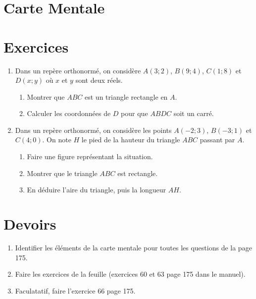 \documentclass{article}
\begin{document}
\section{Carte Mentale}
\section{Exercices}
\begin{enumerate}[label=\textbf{Exercice \arabic* : }]
\item Dans un repère orthonormé, on considère $A(3;2)$, $B(9;4)$, $C(1;8)$ et $D(x;y)$ où $x$ et $y$ sont deux réels.
\begin{enumerate}
    \item Montrer que $ABC$ est un triangle rectangle en $A$.
    \item Calculer les coordonnées de $D$ pour que $ABDC$ soit un carré. 
\end{enumerate}
\item Dans un repère orthonormé, on considère les points $A(-2;3)$, $B(-3;1)$ et $C(4;0)$. On note $H$ le pied de la hauteur du triangle $ABC$ passant par $A$.
\begin{enumerate}
\item Faire une figure représentant la situation.
\item Montrer que le triangle $ABC$ est rectangle.
\item En déduire l'aire du triangle, puis la longueur $AH$.
\end{enumerate}
\end{enumerate}
\section{Devoirs}
\begin{enumerate}
\item Identifier les éléments de la carte mentale pour toutes les questions de la page 175.
\item Faire les exercices de la feuille (exercices 60 et 63 page 175 dans le manuel).
\item Faculatatif, faire l'exercice 66 page 175.
\end{enumerate}
\end{document}
